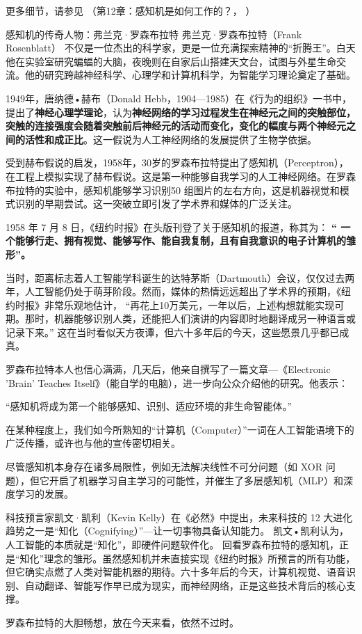更多细节，请参见 （第12章：感知机是如何工作的？， \cite{张玉宏2018}）

\begin{story}{感知机的传奇人物：弗兰克·罗森布拉特} 
弗兰克·罗森布拉特（Frank Rosenblatt） 不仅是一位杰出的科学家，更是一位充满探索精神的“折腾王”。白天他在实验室研究蝙蝠的大脑，夜晚则在自家后山搭建天文台，试图与外星生命交流。他的研究跨越神经科学、心理学和计算机科学，为智能学习理论奠定了基础。

1949年，唐纳德•赫布（Donald Hebb，1904—1985）在《行为的组织》一书中，提出了{\bf 神经心理学理论}，认为{\bf 神经网络的学习过程发生在神经元之间的突触部位，突触的连接强度会随着突触前后神经元的活动而变化，变化的幅度与两个神经元之间的活性和成正比}。这一假说为人工神经网络的发展提供了生物学依据。

受到赫布假说的启发，1958年，30岁的罗森布拉特提出了感知机（Perceptron），在工程上模拟实现了赫布假说。这是第一种能够自我学习的人工神经网络。在罗森布拉特的实验中，感知机能够学习识别50 组图片的左右方向，这是机器视觉和模式识别的早期尝试。这一突破立即引发了学术界和媒体的广泛关注。

1958 年 7 月 8 日，《纽约时报》在头版刊登了关于感知机的报道，称其为：
{\bf“ 一个能够行走、拥有视觉、能够写作、能自我复制，且有自我意识的电子计算机的雏形”。}

当时，距离标志着人工智能学科诞生的达特茅斯（Dartmouth）会议，仅仅过去两年，人工智能仍处于萌芽阶段。然而，媒体的热情远远超出了学术界的预期，《纽约时报》非常乐观地估计，
“再花上10万美元，一年以后，上述构想就能实现可期。那时，机器能够识别人类，还能把人们演讲的内容即时地翻译成另一种语言或记录下来。”
这在当时看似天方夜谭，但六十多年后的今天，这些愿景几乎都已成真。

罗森布拉特本人也信心满满，几天后，他亲自撰写了一篇文章---《Electronic 'Brain' Teaches Itself》（能自学的电脑），进一步向公众介绍他的研究。他表示：

“感知机将成为第一个能够感知、识别、适应环境的非生命智能体。”

在某种程度上，我们如今所熟知的“计算机（Computer）”一词在人工智能语境下的广泛传播，或许也与他的宣传密切相关。

尽管感知机本身存在诸多局限性，例如无法解决线性不可分问题（如 XOR 问题），但它开启了机器学习自主学习的可能性，并催生了多层感知机（MLP）和深度学习的发展。

科技预言家凯文·凯利（Kevin Kelly）在《必然》中提出，未来科技的 12 大进化趋势之一是“知化（Cognifying）”---让一切事物具备认知能力。
凯文•凯利认为，人工智能的本质就是“知化”，即硬件问题软件化。
回看罗森布拉特的感知机，正是“知化”理念的雏形。虽然感知机并未直接实现《纽约时报》所预言的所有功能，但它确实点燃了人类对智能机器的期待。六十多年后的今天，计算机视觉、语音识别、自动翻译、智能写作早已成为现实，而神经网络，正是这些技术背后的核心支撑。

罗森布拉特的大胆畅想，放在今天来看，依然不过时。
\end{story}

